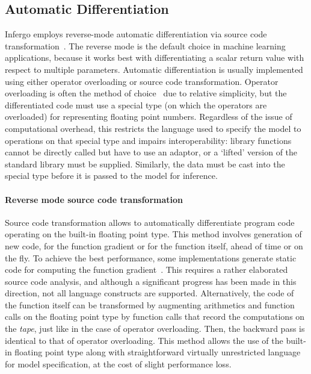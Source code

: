 \documentclass[sigplan,review,10pt,anonymous]{acmart}
\begin{document}
\begin{sloppypar}
\subsection{Automatic Differentiation}

Infergo employs reverse-mode automatic differentiation via
source code transformation~\cite{GW08}. The reverse mode is the
default choice in machine learning applications, because it
works best with differentiating a scalar return value with
respect to multiple parameters. Automatic differentiation is
usually implemented using either operator overloading or source
code transformation. Operator overloading is often the method of
choice~\cite{Stan17,GXG18,PGC+17} due to relative simplicity,
but the differentiated code must use a special type (on which
the operators are overloaded) for representing floating point
numbers. Regardless of the issue of computational overhead, this
restricts the language used to specify the model to operations
on that special type and impairs interoperability: library
functions cannot be directly called but have to use an adaptor,
or a `lifted' version of the standard library must be supplied.
Similarly, the data must be cast into the special type before it
is passed to the model for inference.

\paragraph{Reverse mode source code transformation} Source code
transformation allows to automatically differentiate program
code operating on the built-in floating point type. This method
involves generation of new code, for the function gradient or
for the function itself, ahead of time or on the fly. To achieve
the best performance, some implementations generate static code
for computing the function gradient~\cite{MMW18,I18}. This
requires a rather elaborated source code analysis, and although
a significant progress has been made in this direction, not all
language constructs are supported. Alternatively, the code of
the function itself can be transformed by augmenting arithmetics
and function calls on the floating point type by function calls
that record the computations on the \textit{tape}, just like in
the case of operator overloading. Then, the backward pass is
identical to that of operator overloading. This method allows
the use of the built-in floating point type along with
straightforward virtually unrestricted language for model
specification, at the cost of slight performance loss.


\end{sloppypar}
\end{document}
